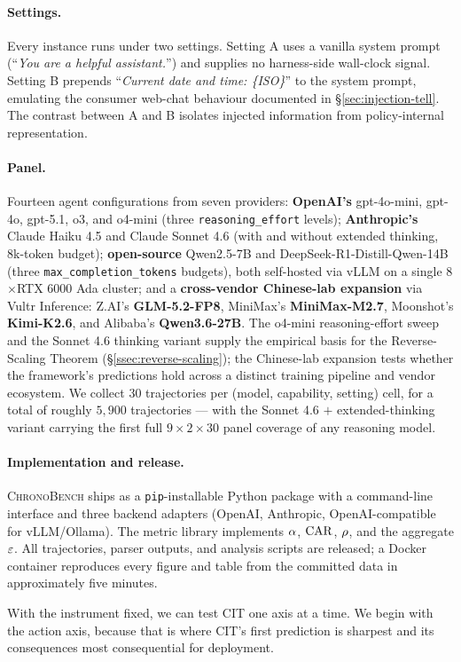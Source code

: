 \paragraph{Settings.}
Every instance runs under two settings. Setting A uses a vanilla system prompt (``\textit{You are a helpful assistant.}'') and supplies no harness-side wall-clock signal. Setting B prepends ``\textit{Current date and time: \{ISO\}}'' to the system prompt, emulating the consumer web-chat behaviour documented in \S\ref{sec:injection-tell}. The contrast between A and B isolates injected information from policy-internal representation.

\paragraph{Panel.}
Fourteen agent configurations from seven providers: \textbf{OpenAI's} gpt-4o-mini, gpt-4o, gpt-5.1, o3, and o4-mini (three \texttt{reasoning\_effort} levels); \textbf{Anthropic's} Claude Haiku 4.5 and Claude Sonnet 4.6 (with and without extended thinking, 8k-token budget); \textbf{open-source} Qwen2.5-7B and DeepSeek-R1-Distill-Qwen-14B (three \texttt{max\_completion\_tokens} budgets), both self-hosted via vLLM on a single 8$\times$RTX 6000 Ada cluster; and a \textbf{cross-vendor Chinese-lab expansion} via Vultr Inference: Z.AI's \textbf{GLM-5.2-FP8}, MiniMax's \textbf{MiniMax-M2.7}, Moonshot's \textbf{Kimi-K2.6}, and Alibaba's \textbf{Qwen3.6-27B}. The o4-mini reasoning-effort sweep and the Sonnet 4.6 thinking variant supply the empirical basis for the Reverse-Scaling Theorem (\S\ref{ssec:reverse-scaling}); the Chinese-lab expansion tests whether the framework's predictions hold across a distinct training pipeline and vendor ecosystem. We collect 30 trajectories per (model, capability, setting) cell, for a total of roughly $5{,}900$ trajectories --- with the Sonnet 4.6 $+$ extended-thinking variant carrying the first full $9\!\times\!2\!\times\!30$ panel coverage of any reasoning model.

\paragraph{Implementation and release.}
\textsc{ChronoBench} ships as a \texttt{pip}-installable Python package with a command-line interface and three backend adapters (OpenAI, Anthropic, OpenAI-compatible for vLLM/Ollama). The metric library implements $\alpha$, $\mathrm{CAR}$, $\rho$, and the aggregate $\varepsilon$. All trajectories, parser outputs, and analysis scripts are released; a Docker container reproduces every figure and table from the committed data in approximately five minutes.

With the instrument fixed, we can test CIT one axis at a time. We begin with the action axis, because that is where CIT's first prediction is sharpest and its consequences most consequential for deployment.

